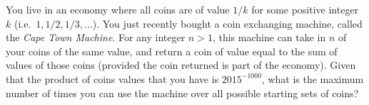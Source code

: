 You live in an economy where all coins are of value $1/k$ for some positive integer $k$ (i.e.\ $1, 1/2, 1/3, \dots$). You just recently bought a coin exchanging machine, called the \emph{Cape Town Machine}. For any integer $n > 1$, this machine can take in $n$ of your coins of the same value, and return a coin of value equal to the sum of values of those coins (provided the coin returned is part of the economy). Given that the product of coins values that you have is $2015^{-1000}$, what is the maximum number of times you can use the machine over all possible starting sets of coins?
